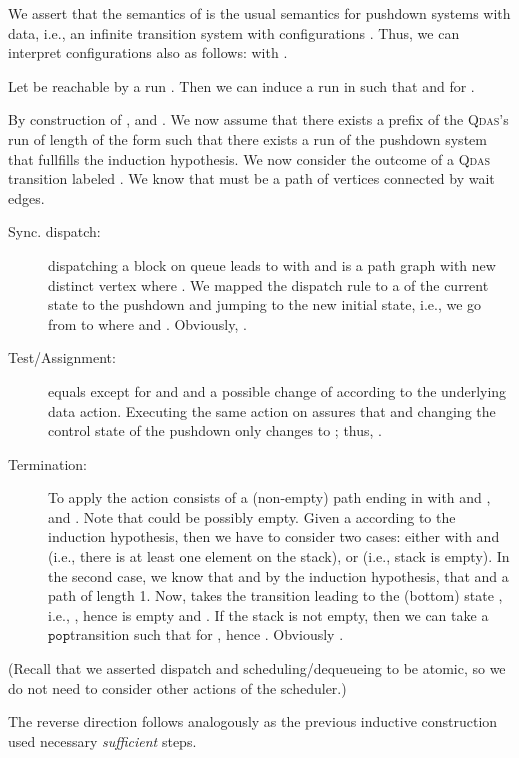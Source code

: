\documentclass[runningheads,oribibl,]{article}
\newcommand{\cfont}[1]{\ensuremath{\mathtt{#1}}\xspace}
\newcommand{\qdas}{\textsc{Qdas}\xspace}
\newcommand{\pop}{\ensuremath{\cfont{pop}}}
\newenvironment{proof}{\noindent{\it Proof.\hspace*{.5cm}}}{}
\newcommand{\qed}{\hfill}
\begin{document}
\propsyncqdaspds*
\begin{proof}
  We assert that the semantics of  is the usual semantics for
  pushdown systems with data, i.e., an infinite transition system with
  configurations .
  Thus, we can interpret configurations also as follows:
   with .

  Let  be reachable by a run
  .
  Then we can induce a run  in  such that  and
   for .

  By construction of ,  and .
  We now assume that there exists a prefix of the \qdas's run of length  of the form
   such that there exists a run of the pushdown system
   that fullfills the induction hypothesis.
  We now consider the outcome of a \qdas transition labeled .
  We know that  must be a path of vertices  connected
  by wait edges.

\begin{description}
\item[Sync. dispatch:] dispatching a block  on queue 
  leads to  with 
  and  is a path graph  with new
  distinct vertex  where .
  We mapped the dispatch rule to a  of the current state to the pushdown
  and jumping to the new initial state, i.e., we go from  to
   where  and
  . Obviously, .
\item[Test/Assignment:]
   equals  except for  and
   and a possible change of  according
  to the underlying data action. Executing the same action on 
  assures that  and changing the control state of
  the pushdown only changes  to ; thus,
  .
\item[Termination:]
      To apply the action  consists of a (non-empty) path ending in
       with  and ,
      and . Note that  could be possibly
      empty.
      Given a  according to the induction hypothesis, then
      we have to consider two cases: either  with 
      and  (i.e., there is at least one element on the stack), or
       (i.e., stack is empty). In the second case, we know that
       and by the induction hypothesis, that 
      and  a path of length 1.
      Now,  takes the  transition leading to the (bottom)
      state , i.e., , hence  is empty and
      .
      If the stack is not empty, then we can take a \pop transition
      such that  for , hence
      . Obviously .
 \end{description}
  (Recall that we asserted dispatch and scheduling/dequeueing to be atomic, so we
  do not need to consider other actions of the scheduler.)

  The reverse direction follows analogously as the previous inductive
  construction used necessary \emph{sufficient} steps.
  \qed
\end{proof}
\end{document}
